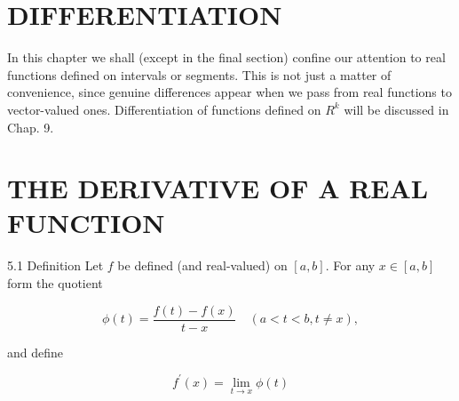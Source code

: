 \documentclass[10pt]{article}
\begin{document}
\section*{DIFFERENTIATION}
In this chapter we shall (except in the final section) confine our attention to real functions defined on intervals or segments. This is not just a matter of convenience, since genuine differences appear when we pass from real functions to vector-valued ones. Differentiation of functions defined on $R^{k}$ will be discussed in Chap. 9.

\section*{THE DERIVATIVE OF A REAL FUNCTION}
5.1 Definition Let $f$ be defined (and real-valued) on $[a, b]$. For any $x \in[a, b]$ form the quotient


\begin{equation*}
\phi(t)=\frac{f(t)-f(x)}{t-x} \quad(a<t<b, t \neq x), \tag{1}
\end{equation*}


and define


\begin{equation*}
f^{\prime}(x)=\lim _{t \rightarrow x} \phi(t) \tag{2}
\end{equation*}
\end{document}
